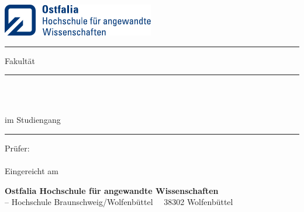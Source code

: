 

    
\begin{titlepage}
    \setlength{\parskip}{0cm}
    \setlength{\parindent}{0cm}
    \sffamily
    \begin{minipage}[t]{66mm}
        \includegraphics[height=14mm]{figs/ostfalia_logo}\par
        \hfill%
        \begin{minipage}[t]{49mm}
            \color{ostfalia-wf-blue}\hrule height 1pt
            \vspace{0.5\baselineskip}
            Fakultät \myFakultaet
        \end{minipage}
    \end{minipage}
        
    \vfill
    
    {\color[gray]{0.66}\hrule height 1pt}\vspace{0.5\baselineskip}
    
    {\large
        \myAuthorA \\
        \myAuthorB
    \par}\vspace{2\baselineskip}
    
    {\Huge
        \myTitle
    \par}\vspace{2\baselineskip}
    
    {\large
        \myTextArt\\
        im Studiengang \myStudiengang\\
    \par}
    {\color[gray]{0.66}\hrule height 1pt}\vspace{4\baselineskip}

    {\large
        Prüfer:\\
        \myPruefer\\[1\baselineskip]
        Eingereicht am \einreichDatum
    \par}

    \vfill
    
    \begin{tcolorbox}[size=tight,
        oversize,
        sharp corners,
        colback=ostfalia-blue,
        colframe=ostfalia-blue,
        boxsep=2ex]
        \color{white}
        \textbf{Ostfalia Hochschule für angewandte Wissenschaften}\\
        -- Hochschule Braunschweig/Wolfenbüttel \textbullet~\strasseFackultaet \textbullet~38302 Wolfenbüttel
    \end{tcolorbox}
    
\end{titlepage}

\restoregeometry